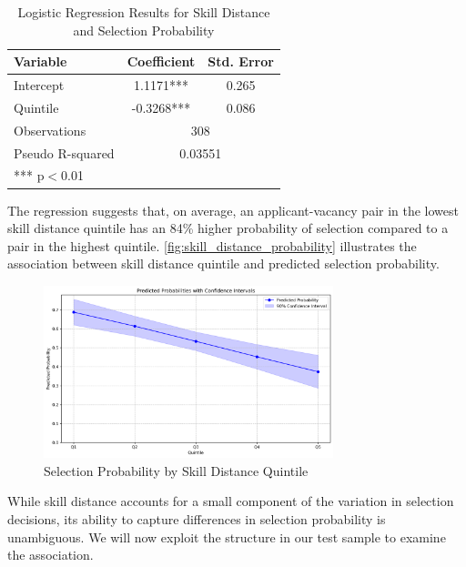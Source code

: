 \documentclass[12pt]{article}
\begin{document}
\begin{table}[h]
    \centering
    \caption{Logistic Regression Results for Skill Distance and Selection Probability}
    \renewcommand{\arraystretch}{1.2} 
    \begin{tabular}{lcc}
    \hline
    \textbf{Variable} & \textbf{Coefficient} & \textbf{Std. Error} \\
    \hline
    Intercept & 1.1171*** & 0.265 \\
    Quintile & -0.3268*** & 0.086 \\
    \hline
    Observations & \multicolumn{2}{c}{308} \\
    Pseudo R-squared & \multicolumn{2}{c}{0.03551} \\
    \hline
    \multicolumn{3}{l}{\footnotesize{*** p$<$0.01}} \\
    \end{tabular}
    \label{tab:logistic_regression}
\end{table}

The regression suggests that, on average, an applicant-vacancy pair in the lowest skill distance quintile has an 84\% higher probability of selection compared to a pair in the highest quintile. \autoref{fig:skill_distance_probability} illustrates the association between skill distance quintile and predicted selection probability.


\begin{figure}[h]
    \centering
    \includegraphics[width=0.75\textwidth]{new_img/pp.png}
    \caption{Selection Probability by Skill Distance Quintile}
    \label{fig:skill_distance_probability}
\end{figure}

While skill distance accounts for a small component of the variation in selection decisions, its ability to capture differences in selection probability is unambiguous. We will now exploit the structure in our test sample to examine the association. 
\end{document}
